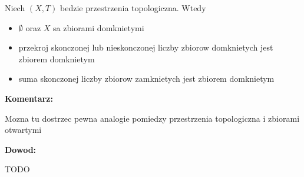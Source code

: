 \documentclass{article}
\begin{document}
\begin{tcolorbox}[colback=white!90!green,colframe=black!35!green,title=1.2.5 Lemat: Przestrzen topologiczna i zbiory domkniete]

    Niech $(X,T)$ bedzie przestrzenia topologiczna. Wtedy

    \begin{itemize}%
        \item $\emptyset$ oraz $X$ sa zbiorami domknietymi
        \item przekroj skonczonej lub nieskonczonej liczby zbiorow domknietych jest zbiorem domknietym
        \item suma skonczonej liczby zbiorow zamknietych jest zbiorem domknietym

    \end{itemize}%
\end{tcolorbox}
\textbf{Komentarz:}

Mozna tu dostrzec pewna analogie pomiedzy przestrzenia topologiczna i zbiorami otwartymi

\textbf{Dowod:}

TODO

\hrulefill
\end{document}
